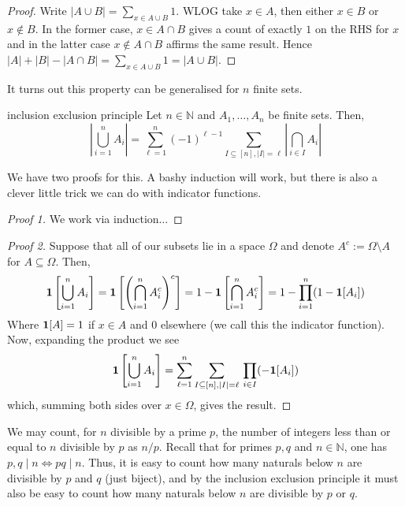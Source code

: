 \documentclass{article}
\begin{document}
\begin{proof}
    Write $|A \cup B| = \sum_{x \in A \cup B}1$.  WLOG take $x \in A$, then either $x \in B$ or $x \not\in B$. In the former 
    case, $x \in A \cap B$ gives a count of exactly $1$ on the RHS for $x$ and in the latter case $x \not\in A \cap B$ 
    affirms the same result. Hence $|A| + |B| - |A \cap B| = \sum_{x \in A \cup B}1 = |A \cup B|$. 
\end{proof}

It turns out this property can be generalised for $n$ finite sets.

\begin{theorem}[]{inclusion exclusion principle}
    Let $n \in \mathbb{N}$ and $A_1, \dots, A_n$ be finite sets. Then, 
    \[\left|\bigcup_{i=1}^n A_i\right| = \sum_{\ell = 1}^n (-1)^{\ell-1}\sum_{I \subseteq [n], |I| = \ell} \left|\bigcap_{i \in I}A_i\right|\]
\end{theorem}

We have two proofs for this. A bashy induction will work, but there is also a clever little trick we can do with indicator functions. 

\begin{proof}[Proof 1]
    We work via induction$\dots$
\end{proof}

\begin{proof}[Proof 2]
    Suppose that all of our subsets lie in a space $\Omega$ and denote $A^c := \Omega \setminus A$ for $A \subseteq \Omega$. Then, 
    \[{\bf 1}\left[\bigcup_{i=1}^n A_i\right] = {\bf 1}\left[\left(\bigcap_{i=1}^n A_i^c\right)^c\right]
    = 1 - {\bf 1}\left[\bigcap_{i=1}^n A_i^c\right] = 1 - \prod_{i=1}^n (1 - {\bf 1}[A_i])\]
    Where ${\bf 1}[A] = 1$ if $x \in A$ and $0$ elsewhere (we call this the indicator function). Now, expanding the 
    product we see 
    \[{\bf 1}\left[\bigcup_{i=1}^n A_i\right] 
    = \sum_{\ell = 1}^n \sum_{I \subseteq [n], \\ |I| = \ell} \, \prod_{i \in I} (- {\bf 1}[A_i])\] 
    which, summing both sides over $x \in \Omega$, gives the result.
\end{proof}

We may count, for $n$ divisible by a prime $p$, the number of integers less than or equal to $n$ divisible by $p$ as $n/p$. 
Recall  that for primes $p, q$ and $n \in \mathbb{N}$, one has $p, q \mid n \Leftrightarrow pq \mid n$. Thus, it is easy to count how 
many naturals below $n$ are divisible by $p$ and $q$ (just biject), and by the inclusion exclusion principle it must also be easy to 
count how many naturals below $n$ are divisible by $p$ or $q$. \\
\end{document}
